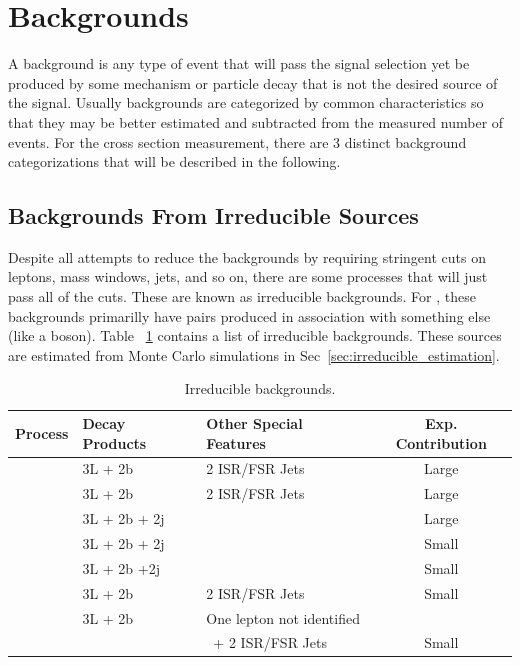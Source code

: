 	\section{Backgrounds}
	\label{sec:background_sources}
	A background is any type of event that will pass the signal selection yet be produced by some mechanism or particle decay that is not the desired source of the signal. Usually backgrounds are categorized by common characteristics so that they may be better estimated and subtracted from the measured number of events. For the \ttZ cross section measurement, there are 3 distinct background categorizations that will be described in the following.
	
	        		\subsection{Backgrounds From Irreducible Sources} 
	Despite all attempts to reduce the backgrounds by requiring stringent cuts on leptons, mass windows, jets, and so on, there are some processes that will just pass all of the cuts. These are known as irreducible backgrounds. For \ttZ, these backgrounds primarilly have \ttbar pairs produced in association with something else (like a boson). Table ~\ref{tab:irreducible_bkg} contains a list of irreducible backgrounds. These sources are estimated from Monte Carlo simulations in Sec~\ref{sec:irreducible_estimation}.
	\begin{table}[hbt]
	\caption{\label{tab:irreducible_bkg} Irreducible backgrounds.}
	\begin{center}
	\begin{tabular}{l|ll|c}\hline\hline %
	Process & Decay Products & Other Special Features & Exp. Contribution\\
	\hline
	\ttW & 3L + 2b& 2 ISR/FSR Jets& Large\\
	\tbZ & 3L + 2b& 2 ISR/FSR Jets & Large\\
	\ttH & 3L + 2b + 2j & & Large \\
	\ttG & 3L + 2b + 2j & & Small \\
	\ttWW & 3L + 2b +2j& & Small\\
	\WZZ & 3L + 2b & 2 ISR/FSR Jets & Small\\
	\ZZZ & 3L + 2b & One lepton not identified\\ 
	         &               & \ + 2 ISR/FSR Jets & Small\\
	
	\hline \hline
	\end{tabular}
	
	\end{center}
	\end{table}
	
